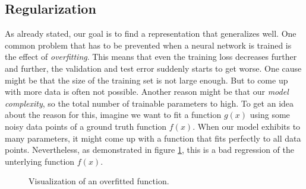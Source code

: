 \subsection{Regularization}

As already stated, our goal is to find a representation that generalizes well. One common problem that has to be prevented when a neural network is trained is the effect of \textit{overfitting}. This means that even the training loss decreases further and further, the validation and test error suddenly starts to get worse. One cause might be that the size of the training set is not large enough. But to come up with more data is often not possible. Another reason might be that our \textit{model complexity}, so the total number of trainable parameters to high. To get an idea about the reason for this, imagine we want to fit a function $g(x)$ using some noisy data points of a ground truth function $f(x)$. When our model exhibits to many parameters, it might come up with a function that fits perfectly to all data points. Nevertheless, as demonstrated in figure \ref{fig:overfitting}, this is a bad regression of the unterlying function $f(x)$.

\begin{figure}[htpb]
  \centering
  \caption[Regularization and overfitting]{Visualization of an overfitted function.}\label{fig:overfitting}
\end{figure}


